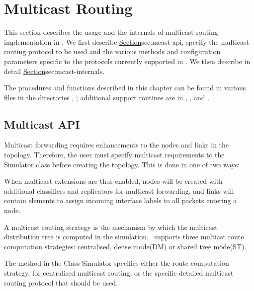 \chapter{Multicast Routing}
\label{chap:multicast}

This section describes the usage and the internals of multicast
routing implementation in \ns.
We first describe 
\href{the user interface to enable multicast routing}{Section}{sec:mcast-api},
specify the multicast routing protocol to be used and the
various methods and configuration parameters specific to the
protocols currently supported in \ns.
We then describe in detail 
\href{the internals and the architecture of the
multicast routing implementation in \ns}{Section}{sec:mcast-internals}.

The procedures and functions described in this chapter can be found in
various files in the directories , ;
additional support routines
are in ,
, and .

\section{Multicast API}
\label{sec:mcast-api}

Multicast forwarding requires enhancements
to the nodes and links in the topology.
Therefore, the user must specify multicast requirements
to the Simulator class before creating the topology.
This is done in one of two ways:
When multicast extensions are thus enabled, nodes will be created with
additional classifiers and replicators for multicast forwarding, and
links will contain elements to assign incoming interface labels to all
packets entering a node.

A multicast routing strategy is the mechanism by which
the multicast distribution tree is computed in the simulation.
\ns\ supports three multiast route computation strategies:
	centralised, dense mode(DM) or shared tree mode(ST).

The method  in the Class Simulator specifies either
the route computation strategy, for centralised multicast routing, or
the specific detailed multicast routing protocol that should be used.


